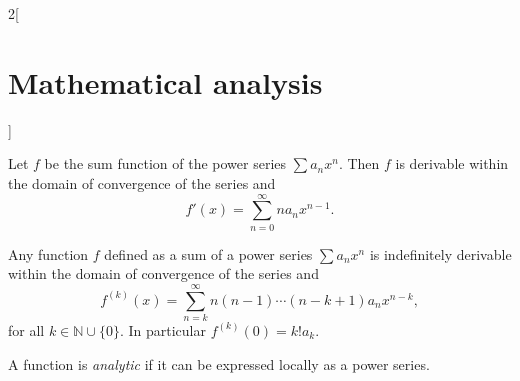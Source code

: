 \documentclass[class=article,crop=false]{standalone}
\begin{document}
\begin{multicols}{2}[\section{Mathematical analysis}]
\begin{corollary}
\end{corollary}
\begin{corollary}
Let $f$ be the sum function of the power series $\sum a_nx^n$. Then $f$ is derivable within the domain of convergence of the series and $$f'(x)=\sum_{n=0}^\infty na_nx^{n-1}.$$
\end{corollary}
\begin{corollary}
Any function $f$ defined as a sum of a power series $\sum a_nx^n$ is indefinitely derivable within the domain of convergence of the series and $$f^{(k)}(x)=\sum_{n=k}^\infty n(n-1)\cdots(n-k+1)a_nx^{n-k},$$
for all $k\in\mathbb{N}\cup\{0\}$. In particular $f^{(k)}(0)=k!a_k$.
\end{corollary}
\begin{definition}
A function is \textit{analytic} if it can be expressed locally as a power series.
\end{definition}

\end{multicols}
\end{document}
